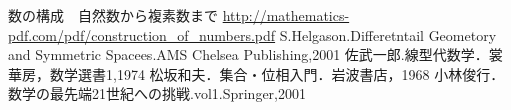 \begin{thebibliography}{99}
 数の構成　自然数から複素数まで \url{http://mathematics-pdf.com/pdf/construction_of_numbers.pdf}
 S.Helgason.Differetntail Geometory and Symmetric Spacees.AMS Chelsea Publishing,2001
 佐武一郎.線型代数学．裳華房，数学選書1,1974
 松坂和夫．集合・位相入門．岩波書店，1968
 小林俊行．数学の最先端21世紀への挑戦.vol1.Springer,2001
\end{thebibliography}